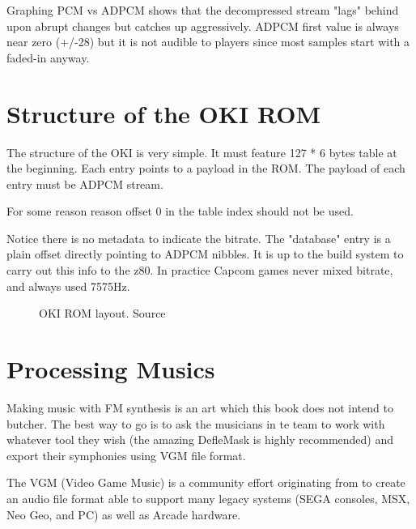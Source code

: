 Graphing PCM vs ADPCM shows that the decompressed stream "lags" behind upon abrupt changes but catches up aggressively. ADPCM first value is always near zero (+/-28) but it is not audible to players since most samples start with a faded-in anyway. 



\section{Structure of the OKI ROM}
The structure of the OKI is very simple. It must feature 127 * 6 bytes table at the beginning. Each entry points to a payload in the ROM. The payload of each entry must be ADPCM stream.

For some reason reason offset 0 in the table index should not be used.



Notice there is no metadata to indicate the bitrate. The "database" entry is a plain offset directly pointing to ADPCM nibbles. It is up to the build system to carry out this info to the z80. In practice Capcom games never mixed bitrate, and always used 7575Hz.

\begin{figure}[H]
\caption*{OKI ROM layout. Source }
\end{figure}















\section{Processing Musics}
Making music with FM synthesis is an art which this book does not intend to butcher. The best way to go is to ask the musicians in te team to work with whatever tool they wish (the amazing DefleMask is highly recommended) and export their symphonies using VGM file format.

The VGM (Video Game Music) is a community effort originating from  to create an audio file format able to support many legacy systems (SEGA consoles, MSX, Neo Geo, and PC) as well as Arcade hardware.

